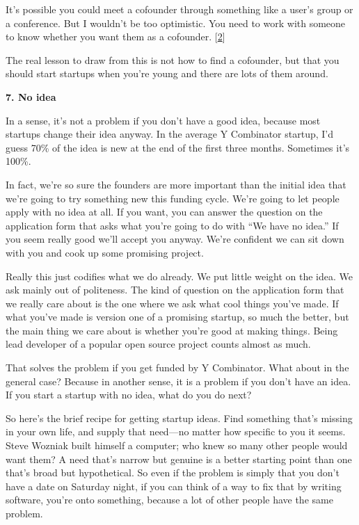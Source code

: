 It's possible you could meet a cofounder through something like a user's
group or a conference. But I wouldn't be too optimistic. You need to
work with someone to know whether you want them as a cofounder.
{[}\hyperref[f2n]{2}{]}

The real lesson to draw from this is not how to find a cofounder, but
that you should start startups when you're young and there are lots of
them around.

\textbf{7. No idea}

In a sense, it's not a problem if you don't have a good idea, because
most startups change their idea anyway. In the average Y Combinator
startup, I'd guess 70\% of the idea is new at the end of the first three
months. Sometimes it's 100\%.

In fact, we're so sure the founders are more important than the initial
idea that we're going to try something new this funding cycle. We're
going to let people apply with no idea at all. If you want, you can
answer the question on the application form that asks what you're going
to do with ``We have no idea.'' If you seem really good we'll accept you
anyway. We're confident we can sit down with you and cook up some
promising project.

Really this just codifies what we do already. We put little weight on
the idea. We ask mainly out of politeness. The kind of question on the
application form that we really care about is the one where we ask what
cool things you've made. If what you've made is version one of a
promising startup, so much the better, but the main thing we care about
is whether you're good at making things. Being lead developer of a
popular open source project counts almost as much.

That solves the problem if you get funded by Y Combinator. What about in
the general case? Because in another sense, it is a problem if you don't
have an idea. If you start a startup with no idea, what do you do next?

So here's the brief recipe for getting startup ideas. Find something
that's missing in your own life, and supply that need---no matter how
specific to you it seems. Steve Wozniak built himself a computer; who
knew so many other people would want them? A need that's narrow but
genuine is a better starting point than one that's broad but
hypothetical. So even if the problem is simply that you don't have a
date on Saturday night, if you can think of a way to fix that by writing
software, you're onto something, because a lot of other people have the
same problem.

